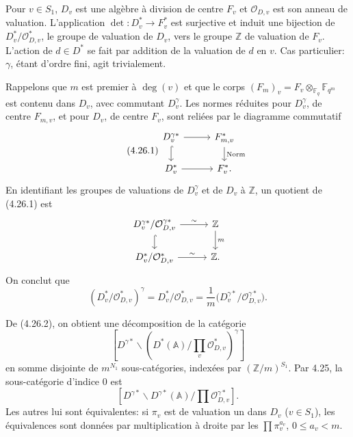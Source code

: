 \documentclass[10pt]{article}
\newcommand{\Fq}{\mathbb F_q}
\newcommand{\Fqm}{\mathbb F_{q^m}}
\newcommand{\Z}{\mathbb Z}
\newcommand{\Adele}{\mathbb A}
\newcommand{\degm}{\operatorname{deg}}
\theoremstyle{deligne}
\newcommand{\heading}[1]{\vspace{0.7em}\noindent{\bfseries #1}\quad}
\begin{document}
\heading{4.26.} Pour $v\in S_1$, $D_v$ est une algèbre à division de centre $F_v$ et $\mathcal O_{D,v}$ est son anneau de valuation. L'application $\det:D_v^*\to F_v^*$ est surjective et induit une bijection de $D_v^*/\mathcal O_{D,v}^*$, le groupe de valuation de $D_v$, vers le groupe $\Z$ de valuation de $F_v$. L'action de $d\in D^*$ se fait par addition de la valuation de $d$ en $v$. Cas particulier: $\gamma$, étant d'ordre fini, agit trivialement.

Rappelons que $m$ est premier à $\degm(v)$ et que le corps $(F_m)_v=F_v\otimes_{\Fq}\Fqm$ est contenu dans $D_v$, avec commutant $D_v^\gamma$. Les normes réduites pour $D_v^\gamma$, de centre $F_{m,v}$, et pour $D_v$, de centre $F_v$, sont reliées par le diagramme commutatif
\begin{equation}\tag{4.26.1}
\begin{tikzcd}[column sep=2.8em,row sep=1.5em]
D_v^{\gamma *} \arrow[r] \arrow[d,hook] & F_{m,v}^* \arrow[d,"\mathrm{Norm}"]\\
D_v^* \arrow[r] & F_v^* .
\end{tikzcd}
\end{equation}
En identifiant les groupes de valuations de $D_v^\gamma$ et de $D_v$ à $\Z$, un quotient de (4.26.1) est
\[
\begin{tikzcd}[column sep=2.8em,row sep=1.5em]
D_v^{\gamma *}/\mathcal O_{D,v}^{\gamma *} \arrow[r,"\sim"] \arrow[d,hook] & \Z \arrow[d,"m"]\\
D_v^*/\mathcal O_{D,v}^* \arrow[r,"\sim"] & \Z .
\end{tikzcd}
\]
On conclut que
\begin{equation}\tag{4.26.2}
(D_v^*/\mathcal O_{D,v}^*)^\gamma=D_v^*/\mathcal O_{D,v}^*=\frac1m\bigl(D_v^{\gamma *}/\mathcal O_{D,v}^{\gamma *}\bigr).
\end{equation}

\heading{4.27.} De (4.26.2), on obtient une décomposition de la catégorie
\[
[D^{\gamma *}\backslash(D^*(\Adele)/\prod_v\mathcal O_{D,v}^*)^\gamma]
\]
en somme disjointe de $m^{N_1}$ sous-catégories, indexées par $(\Z/m)^{S_1}$. Par 4.25, la sous-catégorie d'indice $0$ est
\[
[D^{\gamma *}\backslash D^{\gamma *}(\Adele)/\prod\mathcal O_{D,v}^{\gamma *}].
\]
Les autres lui sont équivalentes: si $\pi_v$ est de valuation un dans $D_v$ ($v\in S_1$), les équivalences sont données par multiplication à droite par les $\prod\pi_v^{a_v}$, $0\le a_v<m$.
\end{document}
